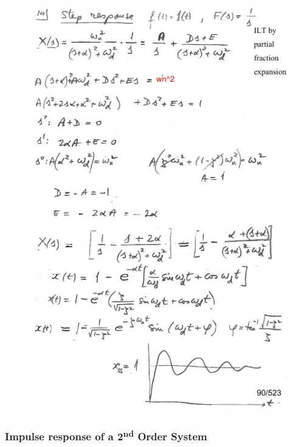 \documentclass[12pt,letter]{article}
\numberwithin{ex}{section} %
\numberwithin{re}{section} %
\numberwithin{equation}{section}	%
\begin{document}
\begin{mdframed}[middlelinewidth=0.5mm]
\begin{figure}[H]
	\includegraphics[width=5.5in]{../figures/x_t_time_response_2nd_order_step_proof_2}
\end{figure}
\end{mdframed}

\subsubsection{Impulse response of a 2\textsuperscript{nd} Order System}
\end{document}
